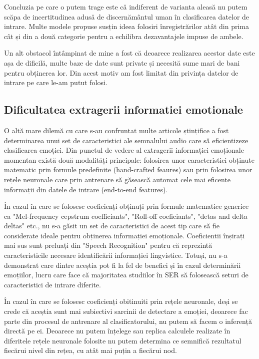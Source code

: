 \documentclass[a4paper,12pt]{book}
\begin{document}
					Concluzia pe care o putem trage este că indiferent de varianta aleasă nu putem scăpa de incertitudinea adusă de discernământul uman în clasificarea datelor de intrare. Multe modele propuse susțin ideea folosiri înregistrărilor atât din prima cât și din a două categorie pentru a echilibra dezavantajele impuse de ambele. \par
					Un alt obstacol întâmpinat de mine a fost că deoarece realizarea acestor date este așa de dificilă, multe baze de date sunt private și necesită sume mari de bani pentru obținerea lor. Din acest motiv am fost limitat din privința datelor de intrare pe care le-am putut folosi.
				
				\subsection{Dificultatea extragerii informatiei emotionale} \label{dif_fex}
					O altă mare dilemă cu care s-au confruntat multe articole ștințifice a fost determinarea unui set de caracteristici ale semnalului audio care să eficientizeze clasificarea emoției. Din punctul de vedere al extragerii informației emoționale momentan există două modalități principale: folosirea unor caracteristici obținute matematic prin formule predefinite (hand-crafted feaures) sau prin folosirea unor rețele neuronale care prin antrenare să găsească automat cele mai eficente informații din datele de intrare (end-to-end features). \par
					În cazul în care se folosesc coeficienți obținuți prin formule matematice generice ca "Mel-frequency cepstrum coefficiants", "Roll-off coeficiants", "detas and delta deltas" etc., nu s-a găsit un set de caracteristici de acest tip care să fie considerate ideale pentru obținerea informației emoționale. Coeficientii înșirați mai sus sunt preluați din "Speech Recognition" pentru că reprezintă caracteristicile necesare identificării informației lingvistice. Totuși, nu s-a demonstrat care dintre aceștia pot fi la fel de benefici și în cazul determinării emoțiilor, lucru care face că majoritatea studiilor în SER să folosească seturi de caracteristici de intrare diferite. \par
					În cazul în care se folosesc coeficienți obitinuiti prin rețele neuronale, deși se crede că aceștia sunt mai subiectivi sarcinii de detectare a emoției, deoarece fac parte din procesul de antrenare al clasificatorului, nu putem să facem o inferență directă pe ei. Deoarece nu putem înțelege sau replica calculele realizate în diferitele rețele neuronale folosite nu putem determina ce semnifică rezultatul fiecărui nivel din rețea, cu atât mai puțin a fiecărui nod. \par
\end{document}
